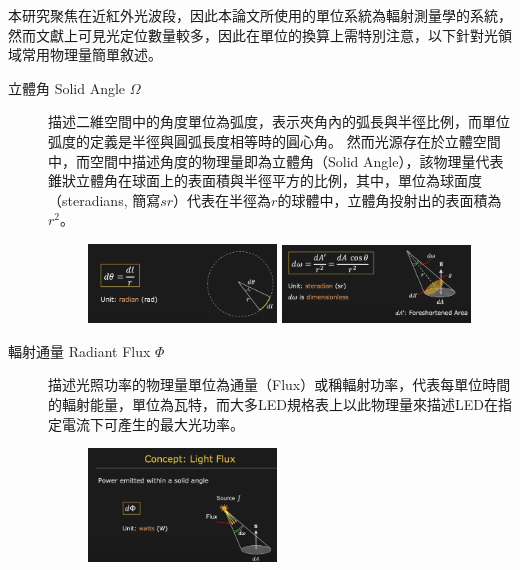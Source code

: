         本研究聚焦在近紅外光波段，因此本論文所使用的單位系統為輻射測量學的系統，然而文獻上可見光定位數量較多，因此在單位的換算上需特別注意，以下針對光領域常用物理量簡單敘述。

        
        \begin{description}
            \item[立體角 Solid Angle $\Omega$] \hfill
                
                描述二維空間中的角度單位為弧度，表示夾角內的弧長與半徑比例，而單位弧度的定義是半徑與圓弧長度相等時的圓心角。
                然而光源存在於立體空間中，而空間中描述角度的物理量即為立體角（Solid Angle），該物理量代表錐狀立體角在球面上的表面積與半徑平方的比例，其中，單位為球面度（steradians, 簡寫$sr$）代表在半徑為$r$的球體中，立體角投射出的表面積為$r^2$。

                \begin{figure}[ht]
                    \centering
                    \includegraphics[width=5cm]{00temppic/1.png}
                    \includegraphics[width=5cm]{00temppic/2.png}
                \end{figure}

            \item[輻射通量 Radiant Flux $\Phi$]  \hfill
                
                描述光照功率的物理量單位為通量（Flux）或稱輻射功率，代表每單位時間的輻射能量，單位為瓦特，而大多LED規格表上以此物理量來描述LED在指定電流下可產生的最大光功率。

                \begin{figure}[ht]
                    \centering
                    \includegraphics[width=5cm]{00temppic/3.png}
                \end{figure}


\end{description}
